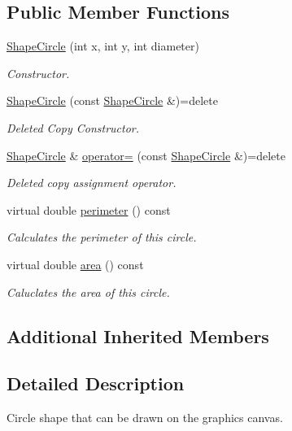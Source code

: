 \subsection*{Public Member Functions}
\begin{DoxyCompactItemize}
\item 
\mbox{\hyperlink{class_shape_circle_a41ae4230eaf5b572a74fe3d9ad62c670}{Shape\+Circle}} (int x, int y, int diameter)
\begin{DoxyCompactList}\small\item\em Constructor. \end{DoxyCompactList}\item 
\mbox{\hyperlink{class_shape_circle_a50e31cb35f2d632fcb9655ba209de3ac}{Shape\+Circle}} (const \mbox{\hyperlink{class_shape_circle}{Shape\+Circle}} \&)=delete
\begin{DoxyCompactList}\small\item\em Deleted Copy Constructor. \end{DoxyCompactList}\item 
\mbox{\hyperlink{class_shape_circle}{Shape\+Circle}} \& \mbox{\hyperlink{class_shape_circle_ac3c25bd9c3ab31cd8001c33d79b88409}{operator=}} (const \mbox{\hyperlink{class_shape_circle}{Shape\+Circle}} \&)=delete
\begin{DoxyCompactList}\small\item\em Deleted copy assignment operator. \end{DoxyCompactList}\item 
virtual double \mbox{\hyperlink{class_shape_circle_ad393d13676b0d0fcb36346b9a90b74af}{perimeter}} () const
\begin{DoxyCompactList}\small\item\em Calculates the perimeter of this circle. \end{DoxyCompactList}\item 
virtual double \mbox{\hyperlink{class_shape_circle_aebc30fb4ad7165778deb75f0bd2d69bd}{area}} () const
\begin{DoxyCompactList}\small\item\em Caluclates the area of this circle. \end{DoxyCompactList}\end{DoxyCompactItemize}
\subsection*{Additional Inherited Members}


\subsection{Detailed Description}
Circle shape that can be drawn on the graphics canvas. 


